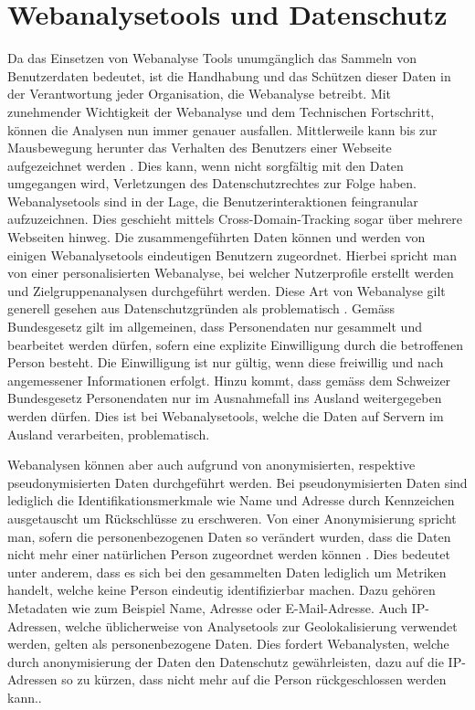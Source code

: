 \section{Webanalysetools und Datenschutz}
Da das Einsetzen von Webanalyse Tools unumgänglich das Sammeln von Benutzerdaten bedeutet, ist die Handhabung und das Schützen dieser Daten in der Verantwortung jeder Organisation, die Webanalyse betreibt. Mit zunehmender Wichtigkeit der Webanalyse und dem Technischen Fortschritt, können die Analysen nun immer genauer ausfallen. Mittlerweile kann bis zur Mausbewegung herunter das Verhalten des Benutzers einer Webseite aufgezeichnet werden \parencite[S. 1]{EcommerceUndDatenschutz}. Dies kann, wenn nicht sorgfältig mit den Daten umgegangen wird,  Verletzungen des Datenschutzrechtes zur Folge haben.
Webanalysetools sind in der Lage, die Benutzerinteraktionen feingranular aufzuzeichnen. Dies geschieht mittels Cross-Domain-Tracking sogar über mehrere Webseiten hinweg. Die zusammengeführten Daten können und werden von einigen Webanalysetools eindeutigen Benutzern zugeordnet. Hierbei spricht man von einer personalisierten Webanalyse, bei welcher Nutzerprofile erstellt werden und Zielgruppenanalysen durchgeführt werden. Diese Art von Webanalyse gilt generell gesehen aus Datenschutzgründen als problematisch \parencite[S. 2]{EcommerceUndDatenschutz}. Gemäss Bundesgesetz \parencite[§§ 4 Abs. 5]{SDSG} gilt im allgemeinen, dass Personendaten nur gesammelt und bearbeitet werden dürfen, sofern eine explizite Einwilligung durch die betroffenen Person besteht. Die Einwilligung ist nur gültig, wenn diese freiwillig und nach angemessener Informationen erfolgt. Hinzu kommt, dass gemäss dem Schweizer Bundesgesetz \parencite[§§ 6 Abs. 1]{SDSG} Personendaten nur im Ausnahmefall ins Ausland weitergegeben werden dürfen. Dies ist bei Webanalysetools, welche die Daten auf Servern im Ausland verarbeiten, problematisch.

Webanalysen können aber auch aufgrund von anonymisierten, respektive pseudonymisierten Daten durchgeführt werden. Bei pseudonymisierten Daten sind lediglich die Identifikationsmerkmale wie Name und Adresse durch Kennzeichen ausgetauscht um Rückschlüsse zu erschweren. Von einer Anonymisierung spricht man, sofern die personenbezogenen Daten so verändert wurden, dass die Daten nicht mehr einer natürlichen Person zugeordnet werden können \parencite[S. 3]{EcommerceUndDatenschutz}. Dies bedeutet unter anderem, dass es sich bei den gesammelten Daten lediglich um Metriken handelt, welche keine Person eindeutig identifizierbar machen. Dazu gehören Metadaten wie zum Beispiel Name, Adresse oder E-Mail-Adresse. Auch IP-Adressen, welche üblicherweise von Analysetools zur Geolokalisierung verwendet werden, gelten als personenbezogene Daten. Dies fordert Webanalysten, welche durch anonymisierung der Daten den Datenschutz gewährleisten, dazu auf die IP-Adressen so zu kürzen, dass nicht mehr auf die Person rückgeschlossen werden kann.\parencite[S. 4]{EcommerceUndDatenschutz}.

